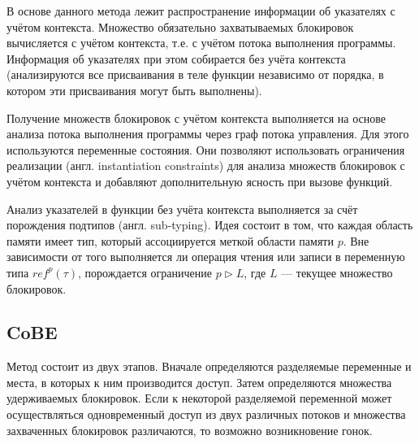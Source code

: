 В основе данного метода лежит распространение информации об указателях с учётом контекста. Множество обязательно захватываемых блокировок вычисляется с учётом контекста, т.е. с учётом потока выполнения программы. Информация об указателях при этом собирается без учёта контекста (анализируются все присваивания в теле функции независимо от порядка, в котором эти присваивания могут быть выполнены).

Получение множеств блокировок с учётом контекста выполняется на основе анализа потока выполнения программы через граф потока управления. Для этого используются переменные состояния. Они позволяют использовать ограничения реализации (англ. instantiation constraints) для анализа множеств блокировок с учётом контекста и добавляют дополнительную ясность при вызове функций.

Анализ указателей в функции без учёта контекста выполняется за счёт порождения подтипов (англ. sub-typing). Идея состоит в том, что каждая область памяти имеет тип, который ассоциируется меткой области памяти $p$. Вне зависимости от того выполняется ли операция чтения или записи в переменную типа $ref^{p}(\tau)$, порождается ограничение $p \triangleright L$, где $L$ — текущее множество блокировок.

\subsection{CoBE}

Метод состоит из двух этапов. Вначале определяются разделяемые переменные и места, в которых к ним производится доступ. Затем определяются множества удерживаемых блокировок. Если к некоторой разделяемой переменной может осуществляться одновременный доступ из двух различных потоков и множества захваченных блокировок различаются, то возможно возникновение гонок.

